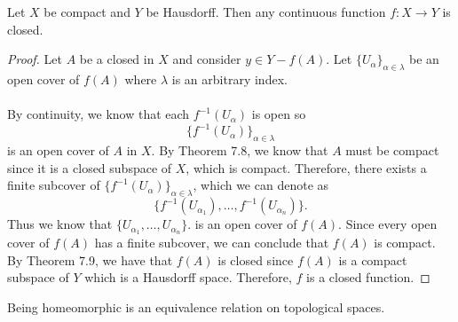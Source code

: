 \documentclass[letter,12pt,twoside]{hmcpset}
\begin{document}
\begin{problem}[Theorem 8.24]
    Let $X$ be compact and $Y$ be Hausdorff. Then any continuous
    function $f : X \rightarrow Y$ is closed. 
\end{problem}

\begin{proof}
    Let $A$ be a closed in $X$ and consider $y \in Y - f(A)$. 
    Let $\{U_\alpha\}_{\alpha \in \lambda}$ be an open cover of 
    $f(A)$ where $\lambda$ is an arbitrary index.
    \\
    \\
    By continuity, we know that each $f^{-1}(U_\alpha)$ is open so
    \[
        \{f^{-1}(U_\alpha)\}_{\alpha \in \lambda}
    \] 
    is an open cover of $A$ in $X$.
    By Theorem 7.8, we know that $A$ must be compact since it is a
    closed subspace of $X$, which is compact. Therefore, there exists
    a finite subcover of $\{f^{-1}(U_\alpha)\}_{\alpha \in \lambda}$, which we can
    denote as 
    \[
        \{f^{-1}(U_{\alpha_1}), \dots , f^{-1}(U_{\alpha_n})\}.
    \]
    Thus we know that $\{U_{\alpha_1}, \dots, U_{\alpha_n}\}$. is an open cover
    of $f(A)$. Since every open cover of $f(A)$ has a finite subcover,
    we can conclude that $f(A)$ is compact. By Theorem 7.9, we have
    that  $f(A)$ is closed since $f(A)$ is a compact subspace of $Y$ which is a Hausdorff
    space. Therefore, $f$ is a closed function.


\end{proof}

\begin{problem}[Theorem 8.25]
    Being homeomorphic is an equivalence relation on topological
    spaces. 
\end{problem}
\end{document}
